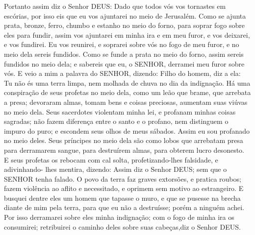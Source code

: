 {Portanto assim diz o Senhor DEUS: Dado que todos vós vos tornastes em escórias, por isso eis que eu vos ajuntarei no meio de Jerusalém.
Como se ajunta prata, bronze, ferro, chumbo e estanho no meio do forno, para soprar fogo sobre eles para fundir, assim vos ajuntarei em minha ira e em meu furor, e
{} vos deixarei, e vos fundirei.
Eu vos reunirei, e soprarei sobre vós no fogo de meu furor, e no meio dela sereis fundidos.
Como se funde a prata no meio do forno, assim sereis fundidos no meio dela; e sabereis que eu, o SENHOR, derramei meu furor sobre vós.
E veio a mim a palavra do SENHOR, dizendo:
Filho do homem, diz a ela: Tu não és uma terra limpa, nem molhada de chuva no dia da indignação.
Há uma conspiração de seus profetas no meio dela, como um leão que brame, que arrebata a presa; devoraram almas, tomam bens e coisas preciosas, aumentam suas viúvas no meio dela.
Seus sacerdotes violentam minha lei, e profanam minhas coisas sagradas; não fazem diferença entre o santo e o profano, nem distinguem o impuro do puro; e escondem seus olhos de meus sábados. Assim eu sou profanado no meio deles.
Seus príncipes no meio dela são como lobos que arrebatam presa para derramarem sangue, para destruírem almas, para obterem lucro desonesto.
E seus profetas os rebocam com cal solta, profetizando-lhes falsidade, e adivinhando- lhes mentira, dizendo: Assim diz o Senhor DEUS; sem que o SENHOR tenha falado.
O povo da terra faz graves extorsões, e pratica roubos; fazem violência ao aflito e necessitado, e oprimem sem motivo ao estrangeiro.
E busquei dentre eles um homem que tapasse o muro, e que se pusesse na brecha diante de mim pela terra, para que eu não a destruísse; porém a ninguém achei.
Por isso derramarei sobre eles minha indignação; com o fogo de minha ira os consumirei; retribuirei o caminho deles sobre suas
{} cabeças,diz o Senhor DEUS.

}
